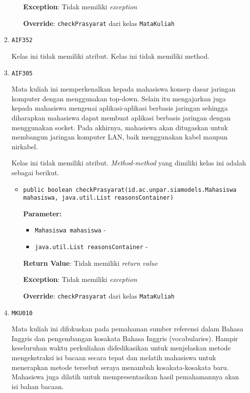 \documentclass{article}
\begin{document}
\begin{enumerate}
\begin{itemize}
\textbf{Exception}: Tidak memiliki \textit{exception}

\textbf{Override}: \texttt{checkPrasyarat} dari kelas \texttt{MataKuliah}

\end{itemize}
\item \texttt{AIF352}



Kelas ini tidak memiliki atribut. Kelas ini tidak memiliki method. \item \texttt{AIF305}

Mata kuliah ini memperkenalkan kepada mahasiswa konsep dasar jaringan
 komputer dengan menggunakan top-down. Selain itu mengajarkan juga kepada
 mahasiswa mengenai aplikasi-aplikasi berbasis jaringan sehingga diharapkan
 mahasiswa dapat membuat aplikasi berbasis jaringan dengan menggunakan socket.
 Pada akhirnya, mahasiswa akan ditugaskan untuk membangun jaringan komputer
 LAN, baik menggunakan kabel maupun nirkabel.

Kelas ini tidak memiliki atribut. \textit{Method-method} yang dimiliki kelas ini adalah sebagai berikut.
\begin{itemize}
\item \texttt{public boolean checkPrasyarat(id.ac.unpar.siamodels.Mahasiswa mahasiswa, java.util.List reasonsContainer)}

\textbf{Parameter:}
\begin{itemize}
\item \texttt{Mahasiswa mahasiswa} - 
\item \texttt{java.util.List reasonsContainer} - 
\end{itemize}
\textbf{Return Value}: Tidak memiliki \textit{return value}

\textbf{Exception}: Tidak memiliki \textit{exception}

\textbf{Override}: \texttt{checkPrasyarat} dari kelas \texttt{MataKuliah}

\end{itemize}
\item \texttt{MKU010}

Mata kuliah ini difokuskan pada pemahaman sumber referensi dalam Bahasa Inggris dan 
 pengembangan kosakata Bahasa Inggris (vocabularies). Hampir keseluruhan waktu perkuliahan 
 didedikasikan untuk menjelaskan metode mengekstraksi isi bacaan secara tepat dan melatih 
 mahasiswa untuk menerapkan metode tersebut seraya menambah kosakata-kosakata baru. 
 Mahasiswa juga dilatih untuk mempresentasikan hasil pemahamannya akan isi bahan bacaan.


\end{enumerate}
\end{document}
